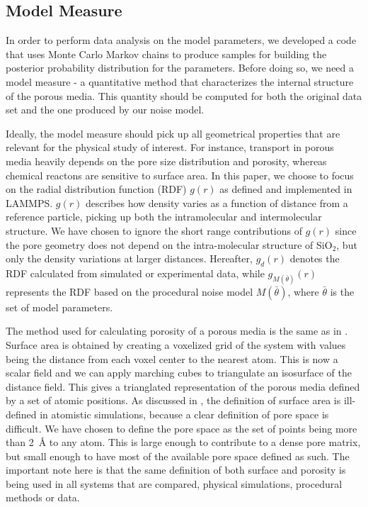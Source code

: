 \documentclass[aps,pre,twocolumn,letterpaper,floatfix,showpacs]{revtex4}
\begin{document}
\subsection{Model Measure}
In order to perform data analysis on the model parameters, we developed a code that
uses Monte Carlo Markov chains to produce samples for building the posterior probability distribution for the parameters. 
Before doing so, we need a model measure - a quantitative method that characterizes
the internal structure of the porous media. This quantity should be computed for both
the original data set and the one produced by our noise model. 

Ideally, the model measure should pick up all geometrical properties that are
relevant for the physical study of interest. 
For instance, transport in porous media heavily depends on the pore size distribution and porosity\cite{kozeny1927uber, carman1937fluid},
whereas chemical reactons are sensitive to surface area\cite{coussy2011mechanics}.
In this paper, we choose to focus on the radial distribution function (RDF)
$g(r)$ as defined and implemented in LAMMPS\cite{plimpton1995fast}.
$g(r)$ describes how density varies as a function of distance from a 
reference particle, picking up both the intramolecular and intermolecular structure. 
We have chosen to ignore the short range contributions of $g(r)$ since
the pore geometry does not depend on the intra-molecular structure of
SiO$_2$, but only the density variations at larger distances. 
Hereafter, $g_d(r)$ denotes the RDF calculated from simulated or experimental data,
while $g_{M(\bar \theta)}(r)$ represents the RDF based on the procedural noise
model $M(\bar \theta)$, where $\bar \theta$ is the set of model parameters. 

The method used for calculating porosity of a porous media is the same as in \cite{gelb1998characterization}.
Surface area is obtained by creating a voxelized grid of the system with values being the distance from each voxel center to the nearest atom.
This is now a scalar field and we can apply marching cubes\cite{lorensen1987marching} to triangulate an isosurface of the distance field.
This gives a trianglated representation of the porous media defined by a set of atomic positions.
As discussed in \cite{gelb1998characterization}, the definition of surface area is ill-defined in
atomistic simulations, because a clear definition of pore space is difficult.
We have chosen to define the pore space as the set of points being more than \SI{2}{\angstrom} to any atom.
This is large enough to contribute to a dense pore matrix, but small enough to have most of the available pore space defined as such. 
The important note here is that the same definition of both surface and porosity is being used in all systems that are compared, physical simulations, procedural methods or data. 
\end{document}
